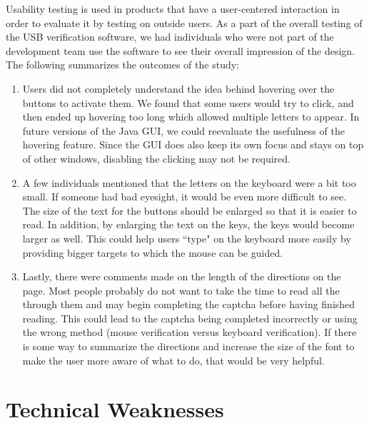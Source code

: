 \documentclass[pagenumbers]{ieee}
\begin{document}
Usability testing is used in products that have a user-centered interaction in order to evaluate it by testing on outside users. As a part of the overall testing of the USB verification software, we had individuals who were not part of the development team use the software to see their overall impression of the design. The following summarizes  the outcomes of the study:
\begin{enumerate}
\item Users did not completely understand the idea behind hovering over the buttons to activate them. We found that some users would try to click, and then ended up hovering too long which allowed multiple letters to appear. In future versions of the Java GUI, we could reevaluate the usefulness of the hovering feature. Since the GUI does also keep its own focus and stays on top of other windows, disabling the clicking may not be required. 
\item A few individuals mentioned that the letters on the keyboard were a bit too small. If someone had bad eyesight, it would be even more difficult to see. The size of the text for the buttons should be enlarged so that it is easier to read. In addition, by enlarging the text on the keys, the keys would become larger as well. This could help users ``type" on the keyboard more easily by providing bigger targets to which the mouse can be guided.
\item Lastly, there were comments made on the length of the directions on the page. Most people probably do not want to take the time to read all the through them and may begin completing the captcha before having finished reading. This could lead to the captcha being completed incorrectly or using the wrong method (mouse verification versus keyboard verification). If there is some way to summarize the directions and increase the size of the font to make the user more aware of what to do, that would be very helpful.
\end{enumerate}


\section{Technical Weaknesses}
\label{section:weakness}
\end{document}
